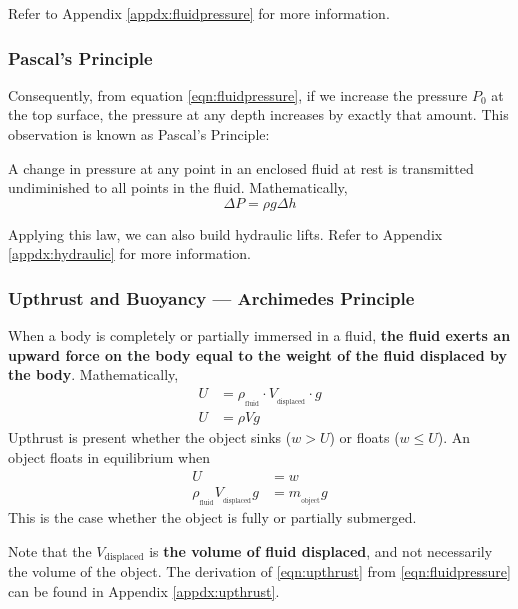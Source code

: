 \documentclass[11pt]{article}
\numberwithin{equation}{section}
\begin{document}
			Refer to Appendix \ref{appdx:fluidpressure} for more information. 
			\subsubsection{Pascal's Principle}
			Consequently, from equation \ref{eqn:fluidpressure}, if we increase the pressure $P_0$ at the top surface, the pressure at any depth increases by exactly that amount. This observation is known as Pascal's Principle:
			\begin{shaded}
				A change in pressure at any point in an enclosed fluid at rest is transmitted undiminished to all points in the fluid. Mathematically,
				\begin{equation}
				\Delta P = \rho g \Delta h
				\end{equation}
			\end{shaded}
			Applying this law, we can also build hydraulic lifts. Refer to Appendix \ref{appdx:hydraulic} for more information. 
			\subsubsection{Upthrust and Buoyancy --- Archimedes Principle}
			\begin{shaded}
				When a body is completely or partially immersed in a fluid, \textbf{the fluid exerts an upward force on the body equal to the weight of the fluid displaced by the body}. Mathematically,
				\begin{equation}
					\begin{aligned}
					\label{eqn:upthrust}
					U &= \rho_{_{\text{fluid}}} \cdot V_{_{\text{displaced}}} \cdot g \\
					U &= \rho V\!g
					\end{aligned}
				\end{equation}
				Upthrust is present whether the object sinks ($w > U$) or floats ($w \leq U$). An object floats in equilibrium when
				\begin{equation}
					\begin{aligned}
					U &= w  \\
					\rho_{_{\text{fluid}}} V_{_{\text{displaced}}} g &= m_{_{\text{object}}}g
					\end{aligned}
				\end{equation}
				This is the case whether the object is fully or partially submerged.
			\end{shaded} 
			Note that the $V_{\text{displaced}}$ is \textbf{the volume of fluid displaced}, and not necessarily the volume of the object. The derivation of \eqref{eqn:upthrust} from \eqref{eqn:fluidpressure} can be found in Appendix \ref{appdx:upthrust}.
			
\end{document}
